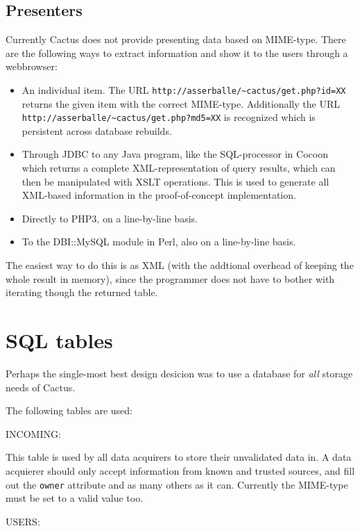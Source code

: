 \subsection{Presenters}

Currently Cactus does not provide presenting data based on
MIME-type.  There are the following ways to extract
information and show it to the users through a webbrowser:

\begin{itemize}
\item An individual item.  The URL
  \texttt{http://asserballe/\~{}cactus/get.php?id=XX} returns
  the given item with the correct MIME-type.  Additionally
  the URL \texttt{http://asserballe/\~{}cactus/get.php?md5=XX}
  is recognized which is persistent across database
  rebuilds.
  
\item Through JDBC to any Java program, like the
  SQL-processor in Cocoon which returns a complete
  XML-representation of query results, which can then be
  manipulated with XSLT operations.  This is used to
  generate all XML-based information in the proof-of-concept
  implementation.
  
\item Directly to PHP3, on a line-by-line basis.
\item To the DBI::MySQL module in Perl, also on a
  line-by-line basis.
\end{itemize}

The easiest way to do this is as XML (with the addtional
overhead of keeping the whole result in memory), since the
programmer does not have to bother with iterating though the
returned table. 

\section{SQL tables}

Perhaps the single-most best design desicion was to use a database for \textit{all} storage needs of Cactus.

The following tables are used:

INCOMING:

This table is used by all data acquirers to store their unvalidated data in.  A
data acquierer should only accept information from known and trusted sources,
and fill out the \texttt{owner} attribute and as many others as it can.
Currently the MIME-type must be set to a valid value too.

USERS:

